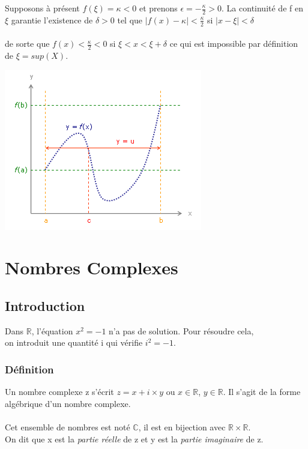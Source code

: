 \documentclass[a4paper,10pt]{book}
\newcommand{\R}{\mathbb{R}}
\newcommand{\C}{\mathbb{C}}
\begin{document}
Supposons à présent $f(\xi)=\kappa <0$ et prenons $\epsilon =-\frac{\kappa}{2}>0$. La continuité de f en $\xi$ garantie l’existence de $\delta >0$ tel que $|f(x)-\kappa |<\frac{\kappa}{2}$ si $|x-\xi |<\delta$\\\\
de sorte que $f(x)<\frac{\kappa}{2}<0$ si $\xi <x<\xi +\delta$ ce qui est impossible par définition de $\xi =sup(X)$.
\begin{center} \includegraphics[scale=0.525]{images/025.png} \end{center}

\chapter{Nombres Complexes}
\section{Introduction}

Dans $\R$, l'équation $x^{2}=-1$ n'a pas de solution. Pour résoudre cela,\\on introduit une quantité i qui vérifie $i^{2}=-1$.\\

\subsection{Définition}
Un nombre complexe z s'écrit $z=x+i \times y$ ou $x \in \R$, $y \in \R$. Il s'agit de la forme algébrique d'un nombre complexe.\\ \\
Cet ensemble de nombres est noté $\C$, il est en bijection avec $\R \times \R$. \\

On dit que x est la \textit{partie réelle} de z et y est la \textit{partie imaginaire} de z.
\end{document}

